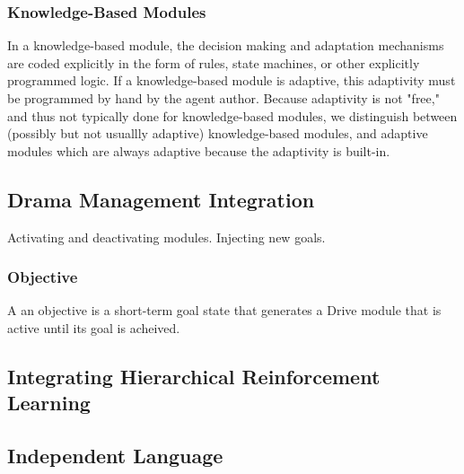 \subsubsection{Knowledge-Based Modules}

In a knowledge-based module, the decision making and adaptation
mechanisms are coded explicitly in the form of rules, state machines,
or other explicitly programmed logic.  If a knowledge-based module is
adaptive, this adaptivity must be programmed by hand by the agent
author.  Because adaptivity is not "free," and thus not typically done
for knowledge-based modules, we distinguish between (possibly but not
usuallly adaptive) knowledge-based modules, and adaptive modules which
are always adaptive because the adaptivity is built-in.

\subsection{Drama Management Integration}

Activating and deactivating modules. Injecting new goals.

\subsubsection{Objective}

A an objective is a short-term goal state that generates a Drive module
that is active until its goal is acheived.

\subsection{Integrating Hierarchical Reinforcement Learning}

\subsection{Independent Language}\label{sec:conclusion-full-language}
